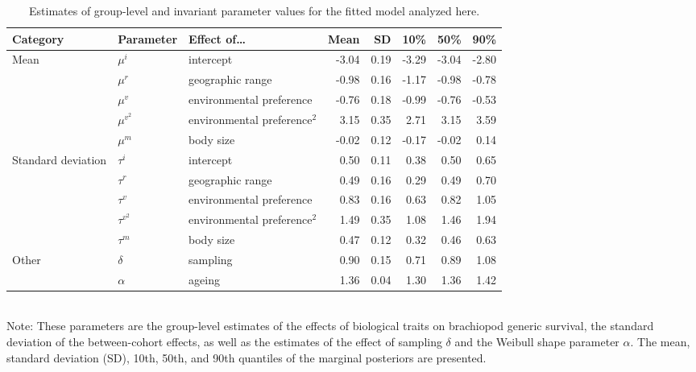 \documentclass[11pt]{article}
\begin{document}
\begin{table}[ht!]
  \caption{Estimates of group-level and invariant parameter values for the fitted model analyzed here. }
  \label{tab:param}
  \begin{centering}
      \begin{tabular}{ l | l p{2.5cm} r r r r r }
        Category & Parameter & Effect of\dots & Mean & SD & 10\% & 50\% & 90\% \\ 
        \hline
        \multirow{5}{*}{Mean} & \(\mu^{i}\) & intercept & -3.04 & 0.19 & -3.29 & -3.04 & -2.80 \\ 
        & \(\mu^{r}\) & geographic range & -0.98 & 0.16 & -1.17 & -0.98 & -0.78 \\ 
        & \(\mu^{v}\) & environmental preference & -0.76 & 0.18 & -0.99 & -0.76 & -0.53 \\ 
        & \(\mu^{v^{2}}\) & environmental preference\(^{2}\) & 3.15 & 0.35 & 2.71 & 3.15 & 3.59 \\ 
        & \(\mu^{m}\) & body size & -0.02 & 0.12 & -0.17 & -0.02 & 0.14 \\ 
        \hline
        \multirow{5}{*}{Standard deviation} & \(\tau^{i}\) & intercept & 0.50 & 0.11 & 0.38 & 0.50 & 0.65 \\ 
        & \(\tau^{r}\) & geographic range & 0.49 & 0.16 & 0.29 & 0.49 & 0.70 \\ 
        & \(\tau^{v}\) & environmental preference & 0.83 & 0.16 & 0.63 & 0.82 & 1.05 \\ 
        & \(\tau^{v^{2}}\) & environmental preference\(^{2}\) & 1.49 & 0.35 & 1.08 & 1.46 & 1.94 \\ 
        & \(\tau^{m}\) & body size & 0.47 & 0.12 & 0.32 & 0.46 & 0.63 \\ 
        \hline
        \multirow{2}{*}{Other} & \(\delta\) & sampling & 0.90 & 0.15 & 0.71 & 0.89 & 1.08 \\ 
        & \(\alpha\) & ageing & 1.36 & 0.04 & 1.30 & 1.36 & 1.42 \\ 
        \hline
      \end{tabular}
  \end{centering}
  \bigskip{}
  \\
  {\footnotesize{Note: These parameters are the group-level estimates of the effects of biological traits on brachiopod generic survival, the standard deviation of the between-cohort effects, as well as the estimates of the effect of sampling \(\delta\) and the Weibull shape parameter \(\alpha\). The mean, standard deviation (SD), 10th, 50th, and 90th quantiles of the marginal posteriors are presented.}}
\end{table}
\clearpage
\end{document}

